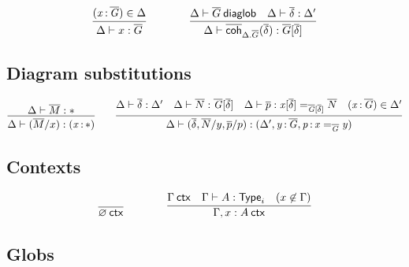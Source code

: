 \begin{small}
  \[
  \infer{\ofdiaglob{\Delta}{x}{\diag G}}
  {(\tptm{x}{\diag G})\in\Delta}
  \qquad\qquad
  \infer{\ofdiaglob{\Delta}{\diagcoh{\Delta.\diag G}{\diag\delta}}
    {\diag G[\diag\delta]}}
  {\wfdiaglob{\Delta}{\diag G}
    & \substdiaglob{\Delta}{\diag\delta}{\Delta'}}
  \]
\end{small}

\subsection{Diagram substitutions}

\begin{small}
  \[
  \infer{\substdiaglob{\Delta}{(\diag M/x)}{(\tptm{x}{\diagbase})}}
  {\ofdiaglob{\Delta}{\diag M}{\diagbase}}
  \qquad
  \infer{\substdiaglob{\Delta}{(\diag \delta,\diag N/y, \diag p/p)}
    {(\Delta',\tptm{y}{\diag G},\tptm{p}{\homj{\diag{G}}{x}{y}})}}
  {\substdiaglob{\Delta}{\diag \delta}{\Delta'}
    & \ofdiaglob{\Delta}{\diag N}{\tsubst{\diag G}{\diag \delta}}
    & \ofdiaglob{\Delta}{\diag p}{\homj{\tsubst{\diag G}{\diag\delta}}
      {\tsubst{x}{\diag \delta}}{\diag N}}
    & (\tptm{x}{\diag G})\in\Delta'}
  \]
\end{small}

\subsection{Contexts}

\begin{small}
  \[
  \infer{\wfctx{\varnothing}}{}
  \qquad\qquad
  \infer{\wfctx{\Gamma,x:A}}
  {\wfctx{\Gamma}
    & \wftype{\Gamma}{A}
    & (x\not\in\Gamma)}
  \]
\end{small}



\subsection{Globs}

